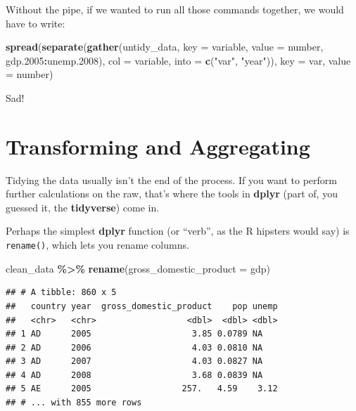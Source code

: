 \documentclass[
  12pt,
  oneside,openany]{book}
\newenvironment{Shaded}{\begin{snugshade}}{\end{snugshade}}
\newcommand{\DataTypeTok}[1]{\textcolor[rgb]{0.13,0.29,0.53}{#1}}
\newcommand{\FloatTok}[1]{\textcolor[rgb]{0.00,0.00,0.81}{#1}}
\newcommand{\KeywordTok}[1]{\textcolor[rgb]{0.13,0.29,0.53}{\textbf{#1}}}
\newcommand{\NormalTok}[1]{#1}
\newcommand{\OperatorTok}[1]{\textcolor[rgb]{0.81,0.36,0.00}{\textbf{#1}}}
\newcommand{\StringTok}[1]{\textcolor[rgb]{0.31,0.60,0.02}{#1}}
\begin{document}
Without the pipe, if we wanted to run all those commands together, we would have to write:

\begin{Shaded}
\begin{Highlighting}[]
\KeywordTok{spread}\NormalTok{(}\KeywordTok{separate}\NormalTok{(}\KeywordTok{gather}\NormalTok{(untidy\_data,}
                       \DataTypeTok{key =}\NormalTok{ variable,}
                       \DataTypeTok{value =}\NormalTok{ number,}
\NormalTok{                       gdp}\FloatTok{.2005}\OperatorTok{:}\NormalTok{unemp}\FloatTok{.2008}\NormalTok{),}
                \DataTypeTok{col =}\NormalTok{ variable,}
                \DataTypeTok{into =} \KeywordTok{c}\NormalTok{(}\StringTok{"var"}\NormalTok{, }\StringTok{"year"}\NormalTok{)),}
       \DataTypeTok{key =}\NormalTok{ var,}
       \DataTypeTok{value =}\NormalTok{ number)}
\end{Highlighting}
\end{Shaded}

Sad!

\hypertarget{transforming-and-aggregating}{%
\section{Transforming and Aggregating}\label{transforming-and-aggregating}}

Tidying the data usually isn't the end of the process. If you want to perform further calculations on the raw, that's where the tools in \textbf{dplyr} (part of, you guessed it, the \textbf{tidyverse}) come in.

Perhaps the simplest \textbf{dplyr} function (or ``verb'', as the R hipsters would say) is \texttt{rename()}, which lets you rename columns.

\begin{Shaded}
\begin{Highlighting}[]
\NormalTok{clean\_data }\OperatorTok{\%>\%}
\StringTok{  }\KeywordTok{rename}\NormalTok{(}\DataTypeTok{gross\_domestic\_product =}\NormalTok{ gdp)}
\end{Highlighting}
\end{Shaded}

\begin{verbatim}
## # A tibble: 860 x 5
##   country year  gross_domestic_product    pop unemp
##   <chr>   <chr>                  <dbl>  <dbl> <dbl>
## 1 AD      2005                    3.85 0.0789 NA   
## 2 AD      2006                    4.03 0.0810 NA   
## 3 AD      2007                    4.03 0.0827 NA   
## 4 AD      2008                    3.68 0.0839 NA   
## 5 AE      2005                  257.   4.59    3.12
## # ... with 855 more rows
\end{verbatim}
\end{document}
